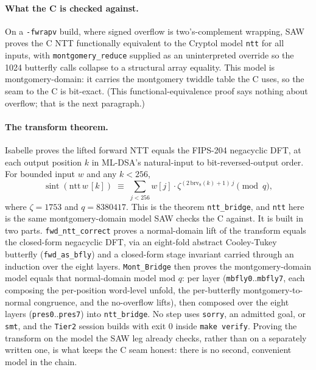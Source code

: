 \documentclass[journal=tches,submission,review]{iacrtrans}
\newcommand{\code}[1]{\texttt{#1}}
\begin{document}
\paragraph{What the C is checked against.} On a \code{-fwrapv} build, where signed overflow is
two's-complement wrapping, SAW proves the C NTT functionally equivalent to the Cryptol model \code{ntt}
for all inputs, with \code{montgomery\_reduce} supplied as an uninterpreted override so the 1024 butterfly
calls collapse to a structural array equality. This model is montgomery-domain: it carries the montgomery
twiddle table the C uses, so the seam to the C is bit-exact. (This functional-equivalence proof says
nothing about overflow; that is the next paragraph.)

\paragraph{The transform theorem.} Isabelle proves the lifted forward NTT equals the FIPS-204 negacyclic
DFT, at each output position $k$ in ML-DSA's natural-input to bit-reversed-output order. For bounded
input $w$ and any $k < 256$,
\[
  \operatorname{sint}(\mathrm{ntt}\,w\,[k]) \;\equiv\;
  \sum_{j<256} w[j]\cdot \zeta^{(2\,\mathrm{brv}_8(k)+1)\,j} \pmod q,
\]
where $\zeta = 1753$ and $q = 8380417$.
This is the theorem \code{ntt\_bridge}, and \code{ntt} here is the same montgomery-domain model SAW checks
the C against. It is built in two parts. \code{fwd\_ntt\_correct} proves a normal-domain lift of the
transform equals the closed-form negacyclic DFT, via an eight-fold abstract Cooley-Tukey butterfly
(\code{fwd\_as\_bfly}) and a closed-form stage invariant carried through an induction over the eight
layers. \code{Mont\_Bridge} then proves the montgomery-domain model equals that normal-domain model mod
$q$: per layer (\code{mbfly0}..\code{mbfly7}, each composing the per-position word-level unfold, the
per-butterfly montgomery-to-normal congruence, and the no-overflow lifts), then composed over the eight
layers (\code{pres0}..\code{pres7}) into \code{ntt\_bridge}. No step uses \code{sorry}, an admitted goal,
or \code{smt}, and the \code{Tier2} session builds with exit 0 inside \code{make verify}. Proving the
transform on the model the SAW leg already checks, rather than on a separately written one, is what keeps
the C seam honest: there is no second, convenient model in the chain.
\end{document}
